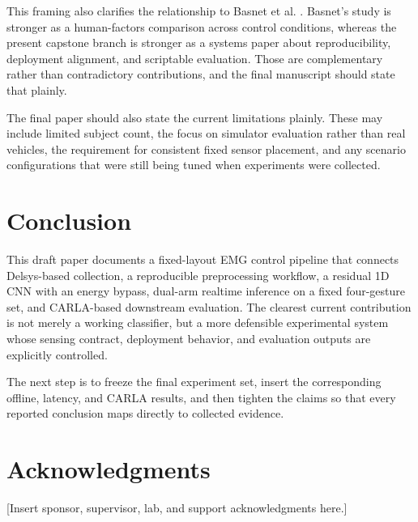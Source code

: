 \documentclass[11pt]{article}
\begin{document}
This framing also clarifies the relationship to Basnet et al. \cite{basnet2026}. Basnet's study is stronger as a human-factors comparison across control conditions, whereas the present capstone branch is stronger as a systems paper about reproducibility, deployment alignment, and scriptable evaluation. Those are complementary rather than contradictory contributions, and the final manuscript should state that plainly.

The final paper should also state the current limitations plainly. These may include limited subject count, the focus on simulator evaluation rather than real vehicles, the requirement for consistent fixed sensor placement, and any scenario configurations that were still being tuned when experiments were collected.

\section{Conclusion}
This draft paper documents a fixed-layout EMG control pipeline that connects Delsys-based collection, a reproducible preprocessing workflow, a residual 1D CNN with an energy bypass, dual-arm realtime inference on a fixed four-gesture set, and CARLA-based downstream evaluation. The clearest current contribution is not merely a working classifier, but a more defensible experimental system whose sensing contract, deployment behavior, and evaluation outputs are explicitly controlled.

The next step is to freeze the final experiment set, insert the corresponding offline, latency, and CARLA results, and then tighten the claims so that every reported conclusion maps directly to collected evidence.

\section*{Acknowledgments}
[Insert sponsor, supervisor, lab, and support acknowledgments here.]
\end{document}
